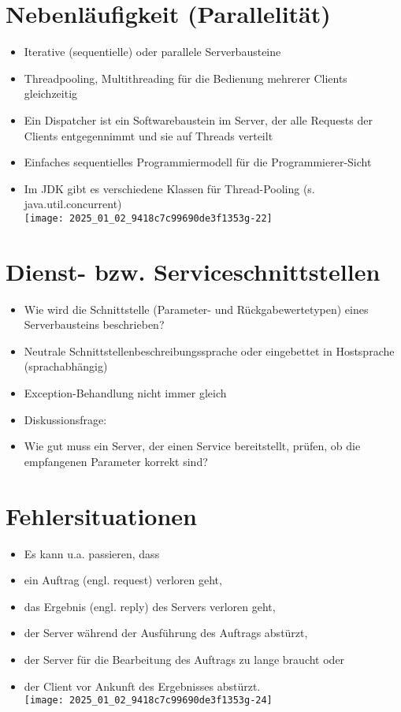\documentclass[10pt]{article}
\begin{document}
\section*{Nebenläufigkeit (Parallelität)}
\begin{itemize}
  \item Iterative (sequentielle) oder parallele Serverbausteine
  \item Threadpooling, Multithreading für die Bedienung mehrerer Clients gleichzeitig
  \item Ein Dispatcher ist ein Softwarebaustein im Server, der alle Requests der Clients entgegennimmt und sie auf Threads verteilt
  \item Einfaches sequentielles Programmiermodell für die Programmierer-Sicht
  \item Im JDK gibt es verschiedene Klassen für Thread-Pooling (s. java.util.concurrent)\\
\texttt{[image: 2025\_01\_02\_9418c7c99690de3f1353g-22]}
\end{itemize}

\section*{Dienst- bzw. Serviceschnittstellen}
\begin{itemize}
  \item Wie wird die Schnittstelle (Parameter- und Rückgabewertetypen) eines Serverbausteins beschrieben?
  \item Neutrale Schnittstellenbeschreibungssprache oder eingebettet in Hostsprache (sprachabhängig)
  \item Exception-Behandlung nicht immer gleich
  \item Diskussionsfrage:
  \item Wie gut muss ein Server, der einen Service bereitstellt, prüfen, ob die empfangenen Parameter korrekt sind?
\end{itemize}

\section*{Fehlersituationen}
\begin{itemize}
  \item Es kann u.a. passieren, dass
  \item ein Auftrag (engl. request) verloren geht,
  \item das Ergebnis (engl. reply) des Servers verloren geht,
  \item der Server während der Ausführung des Auftrags abstürzt,
  \item der Server für die Bearbeitung des Auftrags zu lange braucht oder
  \item der Client vor Ankunft des Ergebnisses abstürzt.\\
\texttt{[image: 2025\_01\_02\_9418c7c99690de3f1353g-24]}
\end{itemize}
\end{document}
